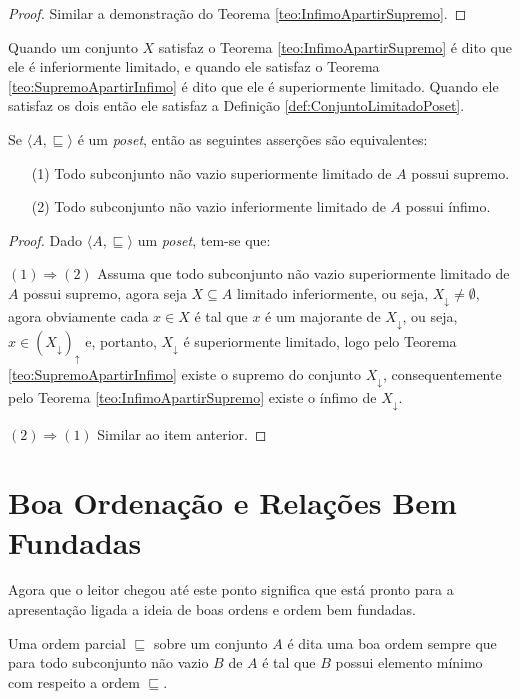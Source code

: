 \begin{proof}
	Similar a demonstração do Teorema \ref{teo:InfimoApartirSupremo}.
\end{proof}

Quando um conjunto $X$ satisfaz o Teorema  \ref{teo:InfimoApartirSupremo} é dito que ele é inferiormente limitado, e quando ele satisfaz o Teorema \ref{teo:SupremoApartirInfimo} é dito que ele é superiormente limitado. Quando ele satisfaz os dois então ele satisfaz a Definição \ref{def:ConjuntoLimitadoPoset}.

\begin{teorema}
	Se $\langle A, \sqsubseteq \rangle$ é um \textit{poset}, então as seguintes asserções são equivalentes:
	\begin{itemize}
		\item[(1)] Todo subconjunto não vazio superiormente limitado de $A$ possui supremo.
		\item[(2)] Todo subconjunto não vazio inferiormente limitado de $A$ possui ínfimo.
	\end{itemize}
\end{teorema}
	
\begin{proof}
	Dado $\langle A, \sqsubseteq \rangle$ um \textit{poset}, tem-se que:
	
	$(1) \Rightarrow (2)$ Assuma que todo subconjunto não vazio superiormente limitado de $A$ possui supremo, agora seja $X \subseteq A$ limitado inferiormente, ou seja, $X_\downarrow \neq \emptyset$, agora obviamente cada $x \in X$ é tal que $x$ é um majorante de $X_\downarrow$, ou seja, $x \in (X_\downarrow)_\uparrow$ e, portanto, $X_\downarrow$ é superiormente limitado, logo pelo Teorema \ref{teo:SupremoApartirInfimo} existe o supremo do conjunto $X_\downarrow$, consequentemente pelo Teorema \ref{teo:InfimoApartirSupremo} existe o ínfimo de $X_\downarrow$.
	
	$(2) \Rightarrow (1)$ Similar ao item anterior.
\end{proof}

\section{Boa Ordenação e Relações Bem Fundadas}\label{sec:BoaOrdem}

Agora que o leitor chegou até este ponto significa que está pronto para a apresentação ligada a ideia de boas ordens e ordem bem fundadas.

\begin{definicao}\label{def:BoaOrdem}
	Uma ordem parcial $\sqsubseteq$ sobre um conjunto $A$ é dita uma boa ordem sempre que para todo subconjunto não vazio $B$ de $A$ é tal que $B$ possui elemento mínimo com respeito a ordem $\sqsubseteq$.
\end{definicao}

